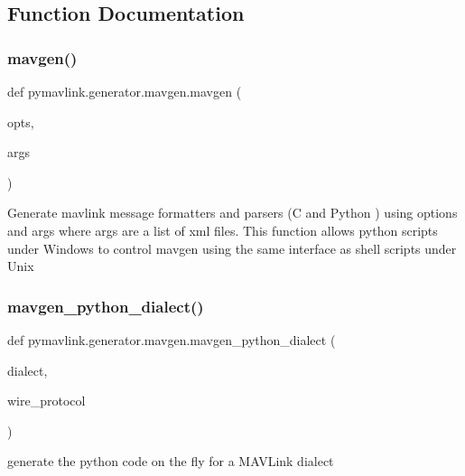 \subsection{Function Documentation}
\mbox{\label{namespacepymavlink_1_1generator_1_1mavgen_a457749ca62432f0cf01d11d6a0a6e09e}} 
\subsubsection{\texorpdfstring{mavgen()}{mavgen()}}
{\footnotesize\ttfamily def pymavlink.\+generator.\+mavgen.\+mavgen (\begin{DoxyParamCaption}\item[{}]{opts,  }\item[{}]{args }\end{DoxyParamCaption})}

\begin{DoxyVerb}Generate mavlink message formatters and parsers (C and Python ) using options
and args where args are a list of xml files. This function allows python
scripts under Windows to control mavgen using the same interface as
shell scripts under Unix\end{DoxyVerb}
 \mbox{\label{namespacepymavlink_1_1generator_1_1mavgen_a9dcfcc3bcf015ac643dc9335255a40df}} 
\subsubsection{\texorpdfstring{mavgen\+\_\+python\+\_\+dialect()}{mavgen\_python\_dialect()}}
{\footnotesize\ttfamily def pymavlink.\+generator.\+mavgen.\+mavgen\+\_\+python\+\_\+dialect (\begin{DoxyParamCaption}\item[{}]{dialect,  }\item[{}]{wire\+\_\+protocol }\end{DoxyParamCaption})}

\begin{DoxyVerb}generate the python code on the fly for a MAVLink dialect\end{DoxyVerb}
 